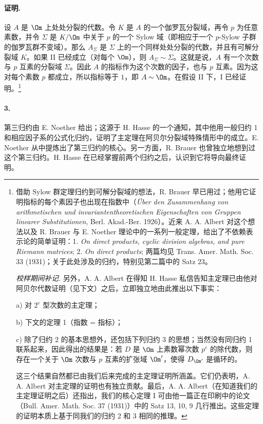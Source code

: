 \paragraph{证明.}
设 \(A\) 是 \(\Om\) 上处处分裂的代数。令 \(K\) 是 \(A\) 的一个伽罗瓦分裂域，再令 \(p\) 为任意素数，并令 \(\Sigma\) 是 \(K/\Om\) 中关于 \(p\) 的一个 Sylow 域（即相应于一个 \(p\)-Sylow 子群的伽罗瓦群不变域）。那么 \(A_{\Sigma}\) 是 \(\Sigma\) 上的一个同样处处分裂的代数，并且有可解分裂域 \(K\)。如果 II 已经成立（对每个 \(\Om\)），则 \(A_{\Sigma}\sim\Sigma\)。这就是说，\(A\) 有一个次数与 \(p\) 互素的分裂域 \(\Sigma\)。因此 \(A\) 的指标作为这个次数的因子，也与 \(p\) 互素。因为这对每个素数 \(p\) 都成立，所以指标等于 \(1\)，即 \(A\sim\Om\)。在假设 II 下，I 已经证明。\footnote{借助 Sylow 群定理归约到可解分裂域的想法，R. Brauer 早已用过；他用它证明指标的每个素因子也出现在指数中（\emph{Über den Zusammenhang von arithmetischen und invariantentheoretischen Eigenschaften von Gruppen linearer Substitutionen}, Berl. Akad.-Ber. 1926）。近来 A. A. Albert 对这个想法以及 R. Brauer 与 E. Noether 理论中的一系列一般定理，给出了不依赖表示论的简单证明：1. \emph{On direct products, cyclic division algebras, and pure Riemann matrices}; 2. \emph{On direct products}; 两篇均见 Trans. Amer. Math. Soc. 33 (1931)；关于此处涉及的归约，特别见第二篇中的 Satz 23。\par \emph{校样期间补记.} 另外，A. A. Albert 在得知 H. Hasse 私信告知主定理已由他对阿贝尔代数证明（见下文）之后，立即独立地由此推出以下事实：\par a) 对 \(2^e\) 型次数的主定理；\par b) 下文的定理 1（指数 = 指标）；\par c) 除了归约 2 的基本思想外，还包括下列归约 3 的思想；当然没有同归约 1 联系起来，因此得出的结果是：若 \(D\) 是 \(\Om\) 上素数幂次数 \(p^e\) 的除代数，则存在一个关于 \(\Om\) 次数与 \(p\) 互素的扩张域 \(\Om'\)，使得 \(D_{\Om'}\) 是循环的。\par 这三个结果自然都已由我们后来完成的主定理证明所涵盖。它们仍表明，A. A. Albert 对主定理的证明也有独立贡献。最后，A. A. Albert（在知道我们的主定理证明之后）还指出，我们的核心定理 I 可由他一篇正在印刷中的论文（Bull. Amer. Math. Soc. 37 (1931)）中的 Satz 13, 10, 9 几行推出。这些定理的证明本质上基于同我们的归约 2 和 3 相同的推理。}

\paragraph{3.}
第三归约由 E. Noether 给出；这源于 H. Hasse 的一个通知，其中他用一般归约 1 和相应因子系的公式化归约，证明了主定理在阿贝尔分裂域特殊情形中的成立。E. Noether 从中提炼出了第三归约的核心。另一方面，R. Brauer 也曾独立地想到过这个第三归约。H. Hasse 在已经掌握前两个归约之后，认识到它将导向最终证明。

